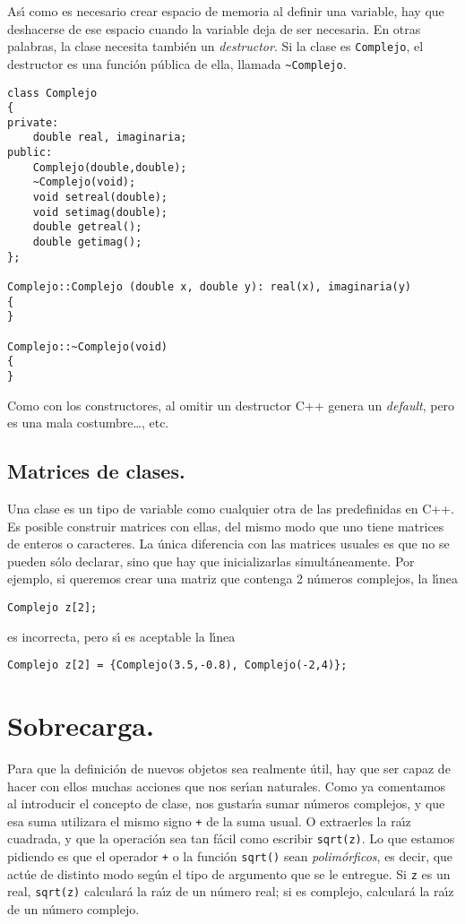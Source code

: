 As{\'\i} como es necesario crear espacio de memoria al definir una
variable, hay que deshacerse de ese espacio cuando la variable deja
de ser necesaria. En otras palabras, la clase necesita tambi{\'e}n un
{\em destructor\/}. Si la clase es \verb+Complejo+, el destructor es
una funci{\'o}n p{\'u}blica de ella, llamada \verb+~Complejo+.  
\begin{verbatim}
class Complejo
{
private:
    double real, imaginaria;
public:
    Complejo(double,double);
    ~Complejo(void);
    void setreal(double);
    void setimag(double);
    double getreal();
    double getimag();
};

Complejo::Complejo (double x, double y): real(x), imaginaria(y)
{
}

Complejo::~Complejo(void)
{
}
\end{verbatim}

Como con los constructores, al omitir un destructor C++ genera un
{\it default}, pero es una mala costumbre\ldots, etc.

\subsection{Matrices de clases.}

Una clase es un tipo de variable como cualquier otra de
las predefinidas en C++. Es posible construir matrices con ellas, del
mismo modo que uno tiene matrices de enteros o caracteres. La {\'u}nica
diferencia con las matrices usuales es que no se pueden s{\'o}lo
declarar, sino que hay que inicializarlas simult{\'a}neamente. Por
ejemplo, si queremos crear una matriz que contenga 2 n{\'u}meros
complejos, la l\'{\i}nea
\begin{verbatim}
Complejo z[2];
\end{verbatim}
es incorrecta, pero s\'{\i} es aceptable la l\'{\i}nea
\begin{verbatim}
Complejo z[2] = {Complejo(3.5,-0.8), Complejo(-2,4)};
\end{verbatim}


\section{Sobrecarga.}

Para que la definici{\'o}n de nuevos objetos sea realmente {\'u}til, hay
que ser capaz de hacer con ellos muchas acciones que nos ser\'{\i}an
naturales. Como ya comentamos al introducir el concepto de clase, 
nos gustar\'{\i}a sumar n{\'u}meros complejos, y que esa suma utilizara
el mismo signo \verb-+- de la suma usual. O extraerles la ra\'{\i}z
cuadrada, y que la operaci{\'o}n sea tan f{\'a}cil como escribir
\verb+sqrt(z)+. Lo que estamos pidiendo es que el operador \verb-+- o
la funci{\'o}n \verb+sqrt()+ sean {\em polim{\'o}rficos}, es decir, que
act{\'u}e de distinto modo seg{\'u}n el tipo de argumento que se le
entregue. Si \verb+z+ es un real, \verb+sqrt(z)+ calcular{\'a} la
ra\'{\i}z de un n{\'u}mero real; si es complejo, calcular{\'a} la
ra\'{\i}z de un n{\'u}mero complejo. 

